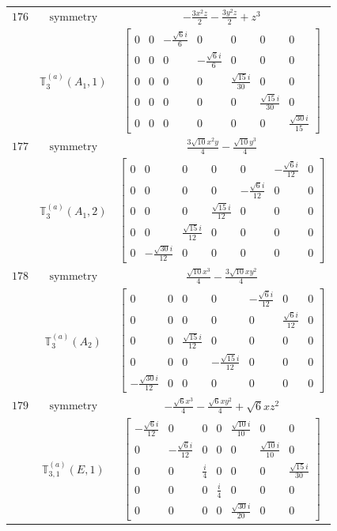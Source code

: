 \documentclass[fleqn,8pt,landscape]{jsarticle}
\begin{document}
\begin{longtable}{ccc}
$ 176 $ & $ \text{symmetry} $ & $ - \frac{3 x^{2} z}{2} - \frac{3 y^{2} z}{2} + z^{3} $ \\
$  $ & $ \mathbb{T}_{3}^{(a)}(A_{1},1) $ & $ \begin{bmatrix} 0 & 0 & - \frac{\sqrt{6} i}{6} & 0 & 0 & 0 & 0 \\ 0 & 0 & 0 & - \frac{\sqrt{6} i}{6} & 0 & 0 & 0 \\ 0 & 0 & 0 & 0 & \frac{\sqrt{15} i}{30} & 0 & 0 \\ 0 & 0 & 0 & 0 & 0 & \frac{\sqrt{15} i}{30} & 0 \\ 0 & 0 & 0 & 0 & 0 & 0 & \frac{\sqrt{30} i}{15} \end{bmatrix} $ \\ \hline
$ 177 $ & $ \text{symmetry} $ & $ \frac{3 \sqrt{10} x^{2} y}{4} - \frac{\sqrt{10} y^{3}}{4} $ \\
$  $ & $ \mathbb{T}_{3}^{(a)}(A_{1},2) $ & $ \begin{bmatrix} 0 & 0 & 0 & 0 & 0 & - \frac{\sqrt{6} i}{12} & 0 \\ 0 & 0 & 0 & 0 & - \frac{\sqrt{6} i}{12} & 0 & 0 \\ 0 & 0 & 0 & \frac{\sqrt{15} i}{12} & 0 & 0 & 0 \\ 0 & 0 & \frac{\sqrt{15} i}{12} & 0 & 0 & 0 & 0 \\ 0 & - \frac{\sqrt{30} i}{12} & 0 & 0 & 0 & 0 & 0 \end{bmatrix} $ \\ \hline
$ 178 $ & $ \text{symmetry} $ & $ \frac{\sqrt{10} x^{3}}{4} - \frac{3 \sqrt{10} x y^{2}}{4} $ \\
$  $ & $ \mathbb{T}_{3}^{(a)}(A_{2}) $ & $ \begin{bmatrix} 0 & 0 & 0 & 0 & - \frac{\sqrt{6} i}{12} & 0 & 0 \\ 0 & 0 & 0 & 0 & 0 & \frac{\sqrt{6} i}{12} & 0 \\ 0 & 0 & \frac{\sqrt{15} i}{12} & 0 & 0 & 0 & 0 \\ 0 & 0 & 0 & - \frac{\sqrt{15} i}{12} & 0 & 0 & 0 \\ - \frac{\sqrt{30} i}{12} & 0 & 0 & 0 & 0 & 0 & 0 \end{bmatrix} $ \\ \hline
$ 179 $ & $ \text{symmetry} $ & $ - \frac{\sqrt{6} x^{3}}{4} - \frac{\sqrt{6} x y^{2}}{4} + \sqrt{6} x z^{2} $ \\
$  $ & $ \mathbb{T}_{3,1}^{(a)}(E,1) $ & $ \begin{bmatrix} - \frac{\sqrt{6} i}{12} & 0 & 0 & 0 & \frac{\sqrt{10} i}{10} & 0 & 0 \\ 0 & - \frac{\sqrt{6} i}{12} & 0 & 0 & 0 & \frac{\sqrt{10} i}{10} & 0 \\ 0 & 0 & \frac{i}{4} & 0 & 0 & 0 & \frac{\sqrt{15} i}{30} \\ 0 & 0 & 0 & \frac{i}{4} & 0 & 0 & 0 \\ 0 & 0 & 0 & 0 & \frac{\sqrt{30} i}{20} & 0 & 0 \end{bmatrix} $ \\ \hline

\end{longtable}
\end{document}
